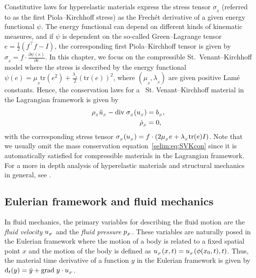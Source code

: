 Constitutive laws for hyperelastic materials express the stress tensor
$\sigma_{_{S}}$ (referred to as the first Piola--Kirchhoff stress)
as the Frech\'{e}t derivative of a given energy functional $\psi$.
The energy functional can depend on different kinds of kinematic measures,
and if $\psi$ is dependent on the so-called Green--Lagrange tensor $e=
\tfrac{1}{2}(f^{\top}f -I)$, the corresponding first Piola--Kirchhoff
tensor is given by $\sigma_{_{S}} = f\cdot\frac{\partial \psi(e)}{\partial
e}$. In this chapter, we focus on the compressible St.~Venant--Kirchhoff
model where the stress is described by the energy functional $\psi(e) =
\mu_{_{S}}\textrm{tr}(e^2) + \frac{\lambda_{_{S}}}{2}(\textrm{tr}(e))^2$,
where $(\mu_{_{S}},\lambda_{_{S}})$ are given positive Lam\'{e}
constants. Hence, the conservation laws for a ~St. Venant--Kirchhoff
material in the Lagrangian framework is given by\vspace*{-3pt}
\begin{align}
\label{selim:eq:SVKmom}
\rhoS \ddotuS - \divv\sigmaS(\uS) &= b_{_{S}},\\
\label{selim:eq:SVKcon}
\dot{\rho}_{_{S}}&=0,\vspace*{-3pt}
\end{align}
with the corresponding stress tensor $\sigma_{_{S}}(u_{_{S}}) = f\cdot(2\mu_{_{S}}e
+ \lambda_{_{S}} \textrm{tr}(e)I)$.  Note that we usually omit the mass
conservation equation~\eqref{selim:eq:SVKcon} since it is automatically
satisfied for compressible materials in the Lagrangian framework.  For a
more in depth analysis of hyperelastic materials and structural mechanics
in general, see \citet{Gurtin1981,Holzapfel2000}.

\vspace*{-2pt}
\subsection{Eulerian framework and fluid mechanics}
\label{selim:sec:fluid}

In fluid mechanics, the primary variables for describing the fluid
motion are the \emph{fluid velocity} $u_{_{F}}$ and the \emph{fluid pressure}
$p_{_{F}}$. These variables are naturally posed in the Eulerian framework
where the motion of a body is related to a fixed spatial point $x$ and the
motion of the body is defined as $u_{_{F}}(x,t) = u_{_{F}}(\phi(x_0,t),t)$. Thus,
the material time derivative of a function $y$ in the Eulerian framework
is given by $\textrm{d}_t(y) = \dot{y} + \textrm{grad}\;y\cdot u_{_{F}}$.

